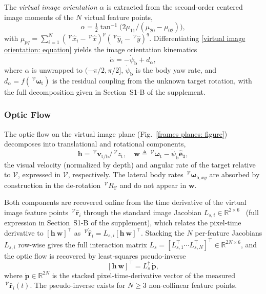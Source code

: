The \emph{virtual image orientation} $\alpha$ is extracted from the second-order centered image moments of the $N$ virtual feature points,
\begin{equation} \label{virtual image orientation: equation}
    \alpha = \tfrac12\tan^{-1}\!\big(2\mu_{11}/(\mu_{20}-\mu_{02})\big),
\end{equation}
with $\mu_{pq} = \sum_{i=1}^{N}(\,^\mathcal{V}\hat{x}_i - \,^\mathcal{V}\hat{x})^p(\,^\mathcal{V}\hat{y}_i - \,^\mathcal{V}\hat{y})^q$. Differentiating \eqref{virtual image orientation: equation} yields the image orientation kinematics
\begin{equation} \label{alpha dot: equation}
    \dot{\alpha} = - \dot{\psi}_\text{b} + d_{\alpha},
\end{equation}
where $\alpha$ is unwrapped to $(-\pi/2,\pi/2]$, $\dot{\psi}_\text{b}$ is the body yaw rate, and $d_{\alpha}=f(\,^\mathcal{V}\boldsymbol{\omega}_{\text{t}})$ is the residual coupling from the unknown target rotation, with the full decomposition given in Section~S1-B of the supplement.

\subsubsection{Optic Flow} \label{optic flow: section}
The optic flow on the virtual image plane (Fig.~\ref{frames planes: figure}) decomposes into translational and rotational components,
\begin{equation} \label{optic flow def: equation}
    \boldsymbol{h} = \,^\mathcal{V}\boldsymbol{v}_{\text{t/b}}/\,^\mathcal{V}z_\text{t}, \quad \boldsymbol{w} \triangleq \,^\mathcal{V}\boldsymbol{\omega}_\text{t}-\dot{\psi}_\text{b}\hat{\boldsymbol{e}}_3,
\end{equation}
the visual velocity (normalized by depth) and angular rate of the target relative to $\mathcal{V}$, expressed in $\mathcal{V}$, respectively. The lateral body rates $\,^\mathcal{V}\boldsymbol{\omega}_{\text{b},xy}$ are absorbed by construction in the de-rotation $\,^\mathcal{V}R_\mathcal{C}$ and do not appear in $\boldsymbol{w}$.

Both components are recovered online from the time derivative of the virtual image feature points $\,^\mathcal{V}\hat{\boldsymbol{r}}_i$ through the standard image Jacobian $L_{s,i}\in\mathbb{R}^{2\times 6}$~\cite{chaumette2006} (full expression in Section~S1-B of the supplement), which relates the pixel-time derivative to $[\boldsymbol{h}~\boldsymbol{w}]^\top$ as $\,^\mathcal{V}\dot{\hat{\boldsymbol{r}}}_i=L_{s,i}[\boldsymbol{h}~\boldsymbol{w}]^\top$. Stacking the $N$ per-feature Jacobians $L_{s,i}$ row-wise gives the full interaction matrix $L_s=[L_{s,1}^\top \cdots L_{s,N}^\top]^\top\in\mathbb{R}^{2N\times 6}$, and the optic flow is recovered by least-squares pseudo-inverse
\begin{equation} \label{optic flow inverse: equation}
    [\boldsymbol{h}~\boldsymbol{w}]^\top = L_s^\dagger\,\dot{\boldsymbol{p}},
\end{equation}
where $\dot{\boldsymbol{p}}\in\mathbb{R}^{2N}$ is the stacked pixel-time-derivative vector of the measured $\,^\mathcal{V}\hat{\boldsymbol{r}}_i(t)$. The pseudo-inverse exists for $N\ge 3$ non-collinear feature points.

